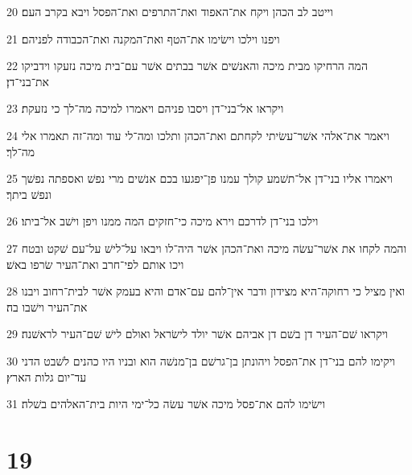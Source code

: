 \par 20 וייטב לב הכהן ויקח את־האפוד ואת־התרפים ואת־הפסל ויבא בקרב העם׃
\par 21 ויפנו וילכו וישׂימו את־הטף ואת־המקנה ואת־הכבודה לפניהם׃
\par 22 המה הרחיקו מבית מיכה והאנשׁים אשׁר בבתים אשׁר עם־בית מיכה נזעקו וידביקו את־בני־דן׃
\par 23 ויקראו אל־בני־דן ויסבו פניהם ויאמרו למיכה מה־לך כי נזעקת׃
\par 24 ויאמר את־אלהי אשׁר־עשׂיתי לקחתם ואת־הכהן ותלכו ומה־לי עוד ומה־זה תאמרו אלי מה־לך׃
\par 25 ויאמרו אליו בני־דן אל־תשׁמע קולך עמנו פן־יפגעו בכם אנשׁים מרי נפשׁ ואספתה נפשׁך ונפשׁ ביתך׃
\par 26 וילכו בני־דן לדרכם וירא מיכה כי־חזקים המה ממנו ויפן וישׁב אל־ביתו׃
\par 27 והמה לקחו את אשׁר־עשׂה מיכה ואת־הכהן אשׁר היה־לו ויבאו על־לישׁ על־עם שׁקט ובטח ויכו אותם לפי־חרב ואת־העיר שׂרפו באשׁ׃
\par 28 ואין מציל כי רחוקה־היא מצידון ודבר אין־להם עם־אדם והיא בעמק אשׁר לבית־רחוב ויבנו את־העיר וישׁבו בה׃
\par 29 ויקראו שׁם־העיר דן בשׁם דן אביהם אשׁר יולד לישׂראל ואולם לישׁ שׁם־העיר לראשׁנה׃
\par 30 ויקימו להם בני־דן את־הפסל ויהונתן בן־גרשׁם בן־מנשׁה הוא ובניו היו כהנים לשׁבט הדני עד־יום גלות הארץ׃
\par 31 וישׂימו להם את־פסל מיכה אשׁר עשׂה כל־ימי היות בית־האלהים בשׁלה׃

\chapter{19}

